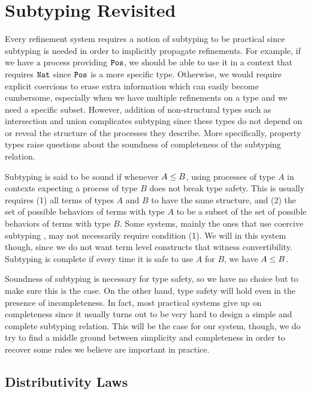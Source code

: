 
\section{Subtyping Revisited}
\label{refinements:subtyping}

Every refinement system requires a notion of subtyping to be practical since subtyping is needed in order to implicitly propagate refinements. For example, if we have a process providing $\mathtt{Pos}$, we should be able to use it in a context that requires $\mathtt{Nat}$ since $\mathtt{Pos}$ is a more specific type. Otherwise, we would require explicit coercions to erase extra information which can easily become cumbersome, especially when we have multiple refinements on a type and we need a specific subset. However, addition of non-structural types such as intersection and union complicates subtyping since these types do not depend on or reveal the structure of the processes they describe. More specifically, property types raise questions about the soundness of completeness of the subtyping relation.

Subtyping is said to be sound if whenever $A \le B$, using processes of type $A$ in contexts expecting a process of type $B$ does not break type safety. This is usually requires (1) all terms of types $A$ and $B$ to have the same structure, and (2) the set of possible behaviors of terms with type $A$ to be a subset of the set of possible behaviors of terms with type $B$. Some systems, mainly the ones that use coercive subtyping , may not necessarily require condition (1). We will in this system though, since we do not want term level constructs that witness convertibility. Subtyping is complete if every time it is safe to use $A$ for $B$, we have $A \le B$.

Soundness of subtyping is necessary for type safety, so we have no choice but to make sure this is the case. On the other hand, type safety will hold even in the presence of incompleteness. In fact, most practical systems give up on completeness since it usually turns out to be very hard to design a simple and complete subtyping relation. This will be the case for our system, though, we do try to find a middle ground between simplicity and completeness in order to recover some rules we believe are important in practice.


\subsection{Distributivity Laws}
\label{distributivity}


